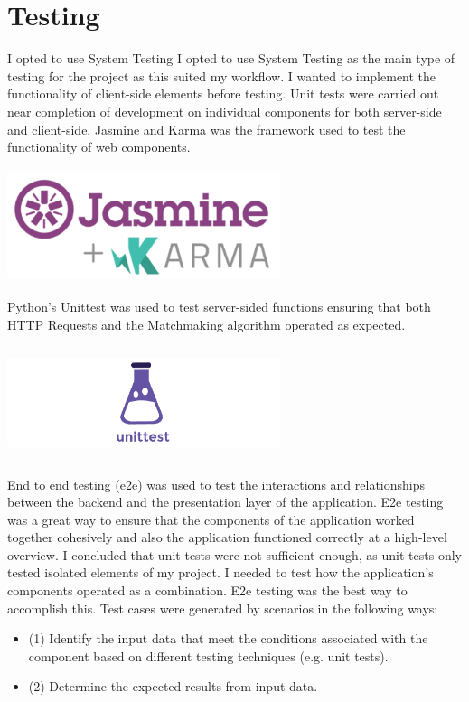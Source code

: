 \section{Testing}
I opted to use System Testing
I opted to use System Testing as the main type of testing for the project as this suited my workflow. I wanted to implement the functionality of client-side elements before testing. Unit tests were carried out near completion of development on individual components for both server-side and client-side. Jasmine and Karma was the framework used to test the functionality of web components.
\begin{center}    
	\includegraphics[width=8cm,height=3.3cm,keepaspectratio]{img/Jasmine_and_Karma.png}
\end{center}
Python’s Unittest was used to test server-sided functions ensuring that both HTTP Requests and the Matchmaking algorithm operated as expected.
\begin{center}    
	\includegraphics[width=8cm,height=3.3cm,keepaspectratio]{img/Unittest.png}
\end{center}
End to end testing (e2e) was used to test the interactions and relationships between the backend and the presentation layer of the application. E2e testing was a great way to ensure that the components of the application worked together cohesively and also the application functioned correctly at a high-level overview. I concluded that unit tests were not sufficient enough, as unit tests only tested isolated elements of my project. I needed to test how the application's components operated as a combination. E2e testing was the best way to accomplish this.
Test cases were generated by scenarios in the following ways:~\cite{bai2001distributed}
\begin{itemize}
	\item (1) Identify the input data that meet the conditions associated with the component based on different testing techniques (e.g. unit tests).
	\item (2) Determine the expected results from input data. 
\end{itemize}
